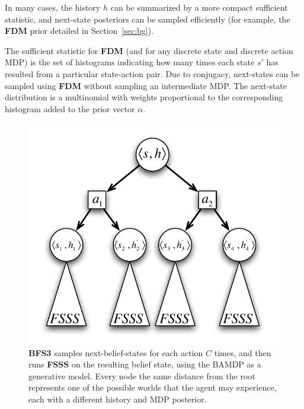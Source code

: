 In many cases, the history $h$ can be summarized by a more compact sufficient statistic, and next-state posteriors can be sampled efficiently (for example, the {\bf FDM} prior detailed in Section~\ref{sec:bg}).

The sufficient statistic for {\bf FDM} (and for any discrete state and discrete action MDP) is the set of histograms indicating how many times each state $s'$ has resulted from a particular state-action pair. Due to conjugacy, next-states can be sampled using {\bf FDM} without sampling an intermediate MDP. The next-state distribution is a multinomial with weights proportional to the corresponding histogram added to the prior vector $\alpha$.

\begin{figure}
\vskip 0.2in
\begin{center}
\centerline{\includegraphics[scale=0.5]{bfs3}}
\caption{
{\bf BFS3} samples next-belief-states for each action $C$ times, and then runs {\bf FSSS} on the resulting belief state, using the BAMDP as a generative model. Every node the same distance from the root represents one of the possible worlds that the agent may experience, each with a different history and MDP posterior.
}
\label{fig:bfs3}
\end{center}
\vskip -0.2in
\end{figure} 

